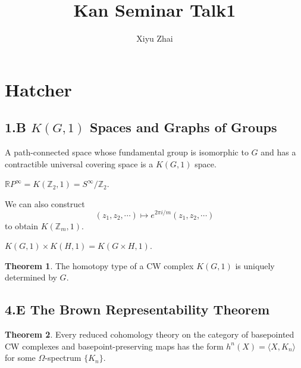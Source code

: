 \documentclass[11pt, oneside]{article}   	%
\title{Kan Seminar Talk1}
\author{Xiyu Zhai}
\date{}							%
\theoremstyle{definition}
\newtheorem*{thm}{Theorem}
\begin{document}
\maketitle
\tableofcontents

\appendix
\section{Hatcher}

\subsection*{1.B $K(G,1)$ Spaces and Graphs of Groups}

A path-connected space whose fundamental group is isomorphic to $G$ and has a contractible universal covering space is a $K(G, 1)$ space.

$\mathbb{R}P^\infty = K(\mathbb{Z}_2, 1) = S^\infty/ \mathbb{Z}_2$.

We can also construct
\begin{equation}
	(z_1,z_2,\cdots) \mapsto e^{2 \pi i/m}(z_1,z_2,\cdots)
\end{equation}
to obtain $K(\mathbb{Z}_m, 1)$.

$K(G,1)\times K(H,1)=K(G\times H, 1)$.

\begin{thm}
	The homotopy type of a CW complex $K(G,1)$ is uniquely determined by $G$.
\end{thm}

\subsection*{4.E The Brown Representability Theorem}

\begin{thm}
	Every reduced cohomology theory on the category of basepointed CW complexes and basepoint-preserving maps has the form $h^n(X) = \langle X, K_n\rangle$ for some $\Omega$-spectrum $\{K_n\}$.
\end{thm}
\end{document}
